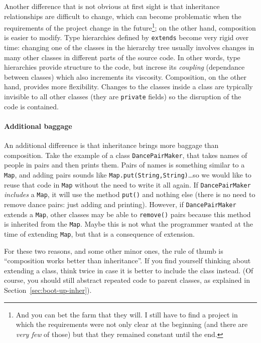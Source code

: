 Another difference that is not obvious at first sight is that 
inheritance relationships are difficult to change, which can 
become problematic when the requirements
of the project change in the future\footnote{And you can bet the farm
  that they will. I still have to find a project in which the
  requirements were not only clear at the beginning (and there are
  \emph{very few} of those) but that they remained constant until the end.}; 
on the other hand, composition is
easier to modify. Type hierarchies defined by \verb+extends+ become
very rigid over time: changing one of the classes in the hierarchy
tree usually involves changes in many other classes in different parts
of the source code. In other words, type hierarchies provide structure
to the code, but increse its \emph{coupling} (dependance between classes) 
which also increments its viscosity. Composition, on
the other hand, provides more flexibility. Changes to the classes
inside a class are typically invisible to all other classes (they are
\verb+private+ fields) so the disruption of the code is contained. 

\paragraph{Additional baggage}
\label{sec:additional-baggage}

An additional difference is that inheritance brings more baggage than
composition. Take the example of a class \verb+DancePairMaker+, that
takes names of people in pairs and then prints them. Pairs of names
is something similar to a \verb+Map+, and adding pairs sounds like
\verb+Map.put(String,String)+\ldots so we would like to reuse that
code in \verb+Map+ without the need to write it all again. 
If \verb+DancePairMaker+ \emph{includes} a
\verb+Map+, it will use the method \verb+put()+ and nothing
else (there is no need to remove dance pairs: just adding and
printing). 
However, if \verb+DancePairMaker+ extends a \verb+Map+, other
classes may be able to \verb+remove()+ pairs because this method is
inherited from the \verb+Map+. 
Maybe this is not what the programmer wanted at the time of extending
\verb+Map+, but that is a consequence of extension. 

For these two reasons, and some other minor ones, the rule of thumb is
``composition works better than inheritance''. If you find yourself
thinking about extending a class, think twice in case it is better to
include the class instead. (Of course,
you should still abstract repeated code to parent classes, as
explained in Section~\ref{sec:boot-up-inher}).





